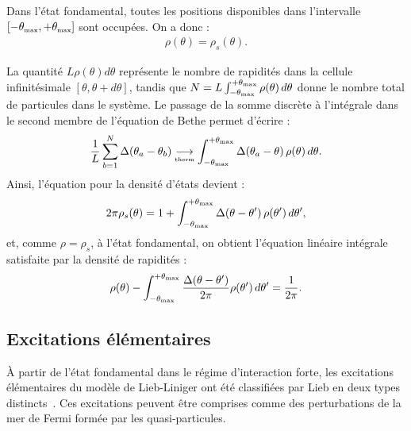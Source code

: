 Dans l’état fondamental, toutes les positions disponibles dans l’intervalle \( [-\theta_{\mbox{\tiny max}}, +\theta_{\mbox{\tiny max}}] \) sont occupées. On a donc :
\begin{eqnarray}\label{chap.1.rho.2}
	\rho(\theta) = \rho_s(\theta).
\end{eqnarray}

La quantité \( L \rho(\theta) d\theta \) représente le nombre de rapidités dans la cellule infinitésimale \( [\theta, \theta + d\theta] \), tandis que
\(
	N = L \int_{-\theta_{\mbox{\tiny max}}}^{+\theta_{\mbox{\tiny max}}} \rho(\theta)\, d\theta
\)
donne le nombre total de particules dans le système. Le passage de la somme discrète à l'intégrale dans le second membre de l'équation de Bethe permet d’écrire :
\begin{eqnarray}
	\frac{1}{L} \sum_{b = 1}^N \Delta(\theta_a - \theta_b) \underset{\text{\tiny therm}}{\longrightarrow }\int_{-\theta_{\mbox{\tiny max}}}^{+\theta_{\mbox{\tiny max}}} \Delta(\theta_a - \theta)\, \rho(\theta)\, d\theta.
\end{eqnarray}
Ainsi, l'équation pour la densité d'états devient :
\begin{eqnarray}\label{chap.1.rho.s.2}
	2\pi \rho_s(\theta) = 1 + \int_{-\theta_{\mbox{\tiny max}}}^{+\theta_{\mbox{\tiny max}}} \Delta(\theta - \theta')\, \rho(\theta')\, d\theta',
\end{eqnarray}
et, comme \( \rho = \rho_s \), à l'état fondamental, on obtient l’équation linéaire intégrale satisfaite par la densité de rapidités :
\begin{eqnarray}\label{chap.1.rho.3}
	\rho(\theta) - \int_{-\theta_{\mbox{\tiny max}}}^{+\theta_{\mbox{\tiny max}}} \frac{\Delta(\theta - \theta')}{2\pi} \rho(\theta')\, d\theta' = \frac{1}{2\pi}.
\end{eqnarray}


\subsection{Excitations élémentaires}

À partir de l’état fondamental dans le régime d’interaction forte, les excitations élémentaires du modèle de Lieb-Liniger ont été classifiées par Lieb en deux types distincts~\cite{Lieb1963}. Ces excitations peuvent être comprises comme des perturbations de la mer de Fermi formée par les quasi-particules.

